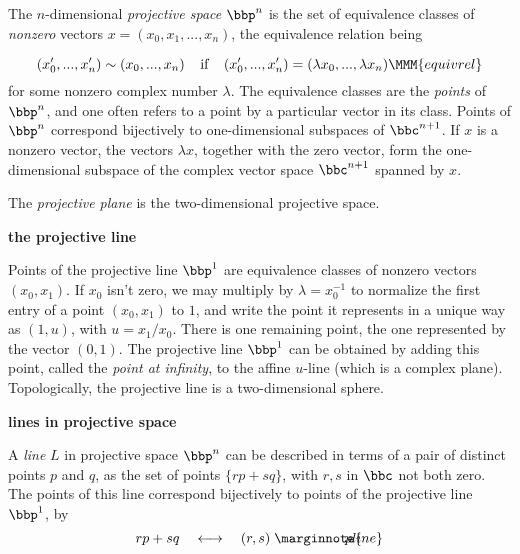 \documentclass[leqno]{book}
\newcommand\Marginnote[1]{\marginnote{\hspace{-12pt}\normalfont{#1}}}
\renewcommand\theequation{\thesection.\arabic{equation}}
\newenvironment{boldequation}{\renewcommand\theequation{\textbf{\thesection.\arabic{equation}}}\equation}
   {\endequation}
\theoremstyle{definition}%
\numberwithin{equation}{section}
\theoremstyle{theorem} %
\begin{document}
 \msno The $n$-dimensional {\it projective space} $\bbp^n$ is the set
 of equivalence classes of {\it nonzero} vectors $x= (x_0,x_1,...,x_n)$,
 the equivalence relation being

\begin{equation}(x_0',...,x_n') \sim (x_0,...,x_n)\;\;\;\;\text{if}\;\;\;\; 
(x_0',...,x_n') = (\lambda x_0,...,\lambda
    x_n)\MMM{equivrel}\label{equivrel}
\end{equation}
 for some nonzero
complex number $\lambda$.  The equivalence classes are the {\it
  points} of $\bbp^n$, and one often refers to a point by a particular
vector in its class.  
 Points of $\bbp^n$  correspond
bijectively to one-dimensional subspaces of $\bbc^{n+1}$.
If $x$ is a nonzero vector, the vectors $\lambda x$, together with the
zero vector, form the one-dimensional subspace of the complex vector
space $\bbc^{n+1}$ spanned by $x$. 

The {\it projective plane} is the two-dimensional projective space.

\begin{boldequation}
\Marginnote{projline}\hspace{-10cm} \textbf {the projective line}
	\label{projline} 
\end{boldequation}


Points of the {projective line} $\bbp^1$ are equivalence classes of
nonzero vectors $(x_0,x_1)$.  If $x_0$ isn't zero, we may multiply by
$\lambda = x_0^{-1}$ to normalize the first entry of a point
$(x_0,x_1)$ to $1$, and write the point it represents in a unique way
as $(1,u)$, with $u=x_1/x_0$.  There is one remaining point, the one
represented by the vector $(0,1)$.  The projective line $\bbp^1$ can
be obtained by adding this point, called the {\it point at infinity},
to the affine $u$-line (which is a complex plane).
Topologically, the projective line is a two-dimensional sphere.

\begin{boldequation}
\Marginnote{projpl}\hspace{-8.5cm} \textbf {lines in  projective space}
	\label{projpl} 
\end{boldequation}


\no
  A {\it line} $L$ in  projective space $\bbp^n$ can be described in terms of
  a pair of distinct points $p$ and $q$, as the set of points
  $\{rp+sq\}$, with $r,s$ in $\bbc$ not both zero.  The points of this
  line correspond bijectively to points of the projective line $\bbp^1$,
by
\begin{equation} rp+sq \quad\longleftrightarrow\quad
  (r,s)\; \Marginnote{pline}
\label{pline}\end{equation}
\end{document}
